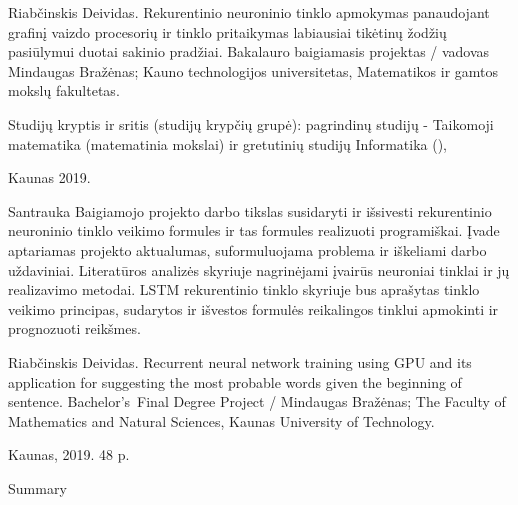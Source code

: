 Riabčinskis Deividas. Rekurentinio neuroninio tinklo apmokymas panaudojant grafinį vaizdo procesorių ir tinklo pritaikymas labiausiai tikėtinų žodžių pasiūlymui duotai sakinio pradžiai. Bakalauro baigiamasis projektas / vadovas Mindaugas Bražėnas; Kauno technologijos universitetas, Matematikos ir gamtos mokslų fakultetas.

Studijų kryptis ir sritis (studijų krypčių grupė): pagrindinų studijų - Taikomoji matematika (matematinia mokslai) ir gretutinių studijų Informatika (), %

Kaunas 2019. %

Santrauka
Baigiamojo projekto darbo tikslas susidaryti ir išsivesti rekurentinio neuroninio tinklo veikimo formules ir tas formules realizuoti programiškai. Įvade aptariamas projekto aktualumas, suformuluojama problema ir iškeliami darbo uždaviniai. Literatūros analizės skyriuje nagrinėjami įvairūs neuroniai tinklai ir jų realizavimo metodai. LSTM rekurentinio tinklo skyriuje bus aprašytas tinklo veikimo principas, sudarytos ir išvestos formulės reikalingos tinklui apmokinti ir prognozuoti reikšmes.

Riabčinskis Deividas. Recurrent neural network training using GPU and its application for suggesting the most probable words given the beginning of sentence. Bachelor's Final Degree Project / Mindaugas Bražėnas; The Faculty of Mathematics and Natural Sciences, Kaunas University of Technology.


Kaunas, 2019. 48 p.

Summary


